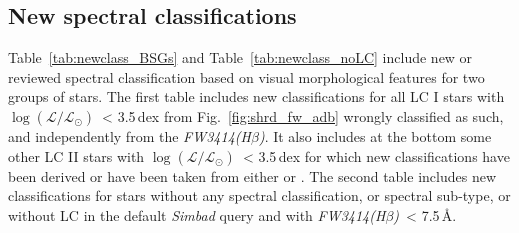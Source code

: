 \documentclass{aa}
\newcommand{\logLs}{$\log (\mathcal{L}/\mathcal{L}_{\odot})$}
\newcommand{\fwhb}{\textit{FW3414(H$\beta$)}}
\begin{document}
\begin{appendix}
\FloatBarrier


\section{New spectral classifications}
\label{apen.newclass}

Table~\ref{tab:newclass_BSGs} and Table~\ref{tab:newclass_noLC} include new or reviewed spectral classification based on visual morphological features for two groups of stars. The first table includes new classifications for all LC I stars with \logLs\ < 3.5\,dex from Fig.~\ref{fig:shrd_fw_adb} wrongly classified as such, and independently from the \fwhb. It also includes at the bottom some other LC II stars with \logLs\ < 3.5\,dex for which new classifications have been derived or have been taken from either \citet{1953ApJ...118..318M,1955ApJS....2...41M} or \citet{1968ApJS...17..371L}. The second table includes new classifications for stars without any spectral classification, or spectral sub-type, or without LC in the default \textit{Simbad} query and with \fwhb\ < 7.5\,\AA.



\end{appendix}
\end{document}
